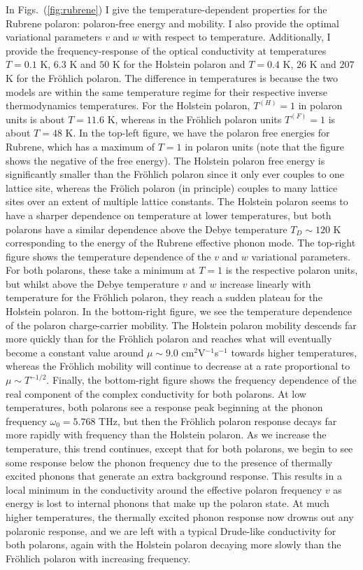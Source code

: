 In Figs.~(\ref{fig:rubrene}) I give the temperature-dependent properties for the Rubrene polaron: polaron-free energy and mobility. I also provide the optimal variational parameters $v$ and $w$ with respect to temperature.  Additionally, I provide the frequency-response of the optical conductivity at temperatures $T = 0.1$ K, $6.3$ K and $50$ K for the Holstein polaron and $T = 0.4$ K, $26$ K and $207$ K for the Fr\"ohlich polaron. The difference in temperatures is because the two models are within the same temperature regime for their respective inverse thermodynamics temperatures. For the Holstein polaron, $T^{(H)} = 1$ in polaron units is about $T = 11.6$ K, whereas in the Fr\"ohlich polaron units $T^{(F)} = 1$ is about $T = 48$ K. In the top-left figure, we have the polaron free energies for Rubrene, which has a maximum of $T = 1$ in polaron units (note that the figure shows the negative of the free energy). The Holstein polaron free energy is significantly smaller than the Fr\"ohlich polaron since it only ever couples to one lattice site, whereas the Fr\"olich polaron (in principle) couples to many lattice sites over an extent of multiple lattice constants. The Holstein polaron seems to have a sharper dependence on temperature at lower temperatures, but both polarons have a similar dependence above the Debye temperature $T_D \sim 120$ K corresponding to the energy of the Rubrene effective phonon mode. The top-right figure shows the temperature dependence of the $v$ and $w$ variational parameters. For both polarons, these take a minimum at $T=1$ is the respective polaron units, but whilst above the Debye temperature $v$ and $w$ increase linearly with temperature for the Fr\"ohlich polaron, they reach a sudden plateau for the Holstein polaron. In the bottom-right figure, we see the temperature dependence of the polaron charge-carrier mobility. The Holstein polaron mobility descends far more quickly than for the Fr\"ohlich polaron and reaches what will eventually become a constant value around $\mu \sim 9.0$ cm$^2$V$^{-1}$s$^{-1}$ towards higher temperatures, whereas the Fr\"ohlich mobility will continue to decrease at a rate proportional to $\mu \sim T^{-1/2}$. Finally, the bottom-right figure shows the frequency dependence of the real component of the complex conductivity for both polarons. At low temperatures, both polarons see a response peak beginning at the phonon frequency $\omega_0 = 5.768$ THz, but then the Fr\"ohlich polaron response decays far more rapidly with frequency than the Holstein polaron. As we increase the temperature, this trend continues, except that for both polarons, we begin to see some response below the phonon frequency due to the presence of thermally excited phonons that generate an extra background response. This results in a local minimum in the conductivity around the effective polaron frequency $v$ as energy is lost to internal phonons that make up the polaron state. At much higher temperatures, the thermally excited phonon response now drowns out any polaronic response, and we are left with a typical Drude-like conductivity for both polarons, again with the Holstein polaron decaying more slowly than the Fr\"ohlich polaron with increasing frequency.


